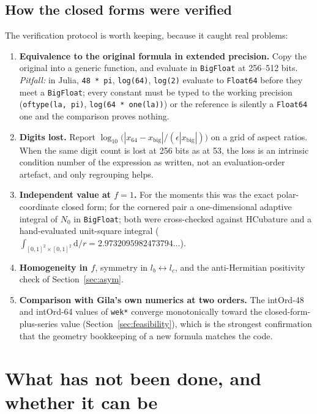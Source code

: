 \documentclass[11pt]{article}
\theoremstyle{remark}
\newcommand{\dd}{\mathrm{d}}
\newcommand{\code}[1]{\texttt{#1}}
\begin{document}
\subsection{How the closed forms were verified}
\label{sec:verify}

The verification protocol is worth keeping, because it caught real problems:
\begin{enumerate}[nosep]
\item \textbf{Equivalence to the original formula in extended precision.} Copy the
original into a generic function, and evaluate in \code{BigFloat} at 256--512 bits.
\emph{Pitfall:} in Julia, \code{48 * pi}, \code{log(64)}, \code{log(2)} evaluate to
\code{Float64} before they meet a \code{BigFloat}; every constant must be typed to the
working precision (\code{oftype(la, pi)}, \code{log(64 * one(la))}) or the reference
is silently a \code{Float64} one and the comparison proves nothing.
\item \textbf{Digits lost.} Report $\log_{10}\bigl(|x_{64} - x_{\mathrm{big}}| /
(\epsilon |x_{\mathrm{big}}|)\bigr)$ on a grid of aspect ratios. When the same digit
count is lost at 256 bits as at 53, the loss is an intrinsic condition number of the
expression as written, not an evaluation-order artefact, and only regrouping helps.
\item \textbf{Independent value at $f = 1$.} For the moments this was the exact
polar-coordinate closed form; for the cornered pair a one-dimensional adaptive
integral of $N_0$ in \code{BigFloat}; both were cross-checked against HCubature and a
hand-evaluated unit-square integral ($\int_{[0,1]^2\times[0,1]^2}\dd/r =
2.9732095982473794\ldots$).
\item \textbf{Homogeneity in $f$}, symmetry in $l_b\leftrightarrow l_c$, and the
anti-Hermitian positivity check of Section~\ref{sec:asym}.
\item \textbf{Comparison with Gila's own numerics at two orders.} The
intOrd-48 and intOrd-64 values of \code{wek*} converge monotonically toward the
closed-form-plus-series value (Section~\ref{sec:feasibility}), which is the strongest
confirmation that the geometry bookkeeping of a new formula matches the code.
\end{enumerate}

\section{What has not been done, and whether it can be}
\label{sec:notdone}
\end{document}
